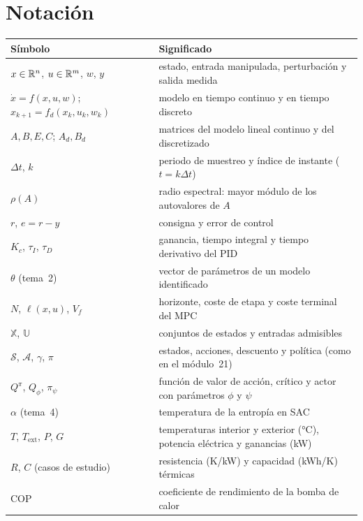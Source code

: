 \documentclass[11pt,a4paper,twoside,openany]{book}
\newcommand{\Sset}{\mathcal{S}}
\newcommand{\Aset}{\mathcal{A}}
\newcommand{\Xset}{\mathbb{X}}
\newcommand{\Uset}{\mathbb{U}}
\newcommand{\Dt}{\Delta t}
\newcommand{\Text}{T_{\mathrm{ext}}}
\newcommand{\COP}{\mathrm{COP}}
\begin{document}
\section*{Notación}
\begin{center}\small
\begin{tabularx}{\textwidth}{@{}l>{\raggedright\arraybackslash}X@{}}
\toprule
Símbolo & Significado \\
\midrule
$x\in\mathbb{R}^{n}$, $u\in\mathbb{R}^{m}$, $w$, $y$ & estado, entrada manipulada, perturbación y salida medida \\
$\dot x=f(x,u,w)$; $x_{k+1}=f_d(x_k,u_k,w_k)$ & modelo en tiempo continuo y en tiempo discreto \\
$A,B,E,C$; $A_d,B_d$ & matrices del modelo lineal continuo y del discretizado \\
$\Dt$, $k$ & periodo de muestreo y índice de instante ($t=k\Dt$) \\
$\rho(A)$ & radio espectral: mayor módulo de los autovalores de $A$ \\
$r$, $e=r-y$ & consigna y error de control \\
$K_c$, $\tau_I$, $\tau_D$ & ganancia, tiempo integral y tiempo derivativo del PID \\
$\theta$ (tema~2) & vector de parámetros de un modelo identificado \\
$N$, $\ell(x,u)$, $V_f$ & horizonte, coste de etapa y coste terminal del MPC \\
$\Xset$, $\Uset$ & conjuntos de estados y entradas admisibles \\
$\Sset$, $\Aset$, $\gamma$, $\pi$ & estados, acciones, descuento y política (como en el módulo~21) \\
$Q^{\pi}$, $Q_\phi$, $\pi_\psi$ & función de valor de acción, crítico y actor con parámetros $\phi$ y $\psi$ \\
$\alpha$ (tema~4) & temperatura de la entropía en SAC \\
$T$, $\Text$, $P$, $G$ & temperaturas interior y exterior (°C), potencia eléctrica y ganancias (kW) \\
$R$, $C$ (casos de estudio) & resistencia (K/kW) y capacidad (kWh/K) térmicas \\
$\COP$ & coeficiente de rendimiento de la bomba de calor \\
\bottomrule
\end{tabularx}
\end{center}


\tableofcontents

\mainmatter







\backmatter

\end{document}
